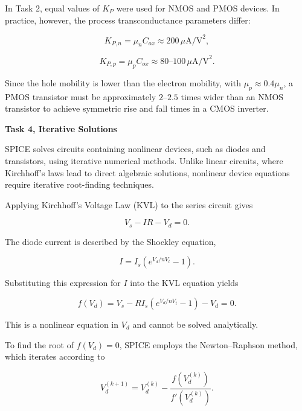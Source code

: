 \documentclass[a4paper,12pt]{article}
\begin{document}
In Task 2, equal values of $K_P$ were used for NMOS and PMOS devices. In practice, however, the process transconductance parameters differ:

\begin{equation}
K_{P,n} = \mu_n C_{ox} \approx 200\,\mu\text{A/V}^2,
\end{equation}

\begin{equation}
K_{P,p} = \mu_p C_{ox} \approx 80\text{--}100\,\mu\text{A/V}^2.
\end{equation}

Since the hole mobility is lower than the electron mobility, with $\mu_p \approx 0.4\mu_n$, a PMOS transistor must be approximately $2$--$2.5$ times wider than an NMOS transistor to achieve symmetric rise and fall times in a CMOS inverter.

\textbf{Task 4, Iterative Solutions}

SPICE solves circuits containing nonlinear devices, such as diodes and transistors, using iterative numerical methods. Unlike linear circuits, where Kirchhoff’s laws lead to direct algebraic solutions, nonlinear device equations require iterative root-finding techniques.

Applying Kirchhoff’s Voltage Law (KVL) to the series circuit gives

\begin{equation}
V_s - I R - V_d = 0.
\end{equation}

The diode current is described by the Shockley equation,

\begin{equation}
I = I_s \left( e^{V_d / n V_t} - 1 \right).
\end{equation}

Substituting this expression for $I$ into the KVL equation yields

\begin{equation}
f(V_d) = V_s - R I_s \left( e^{V_d / n V_t} - 1 \right) - V_d = 0.
\end{equation}

This is a nonlinear equation in $V_d$ and cannot be solved analytically.

To find the root of $f(V_d) = 0$, SPICE employs the Newton--Raphson method, which iterates according to

\begin{equation}
V_d^{(k+1)} = V_d^{(k)} - \frac{f\!\left(V_d^{(k)}\right)}{f'\!\left(V_d^{(k)}\right)}.
\end{equation}
\end{document}
